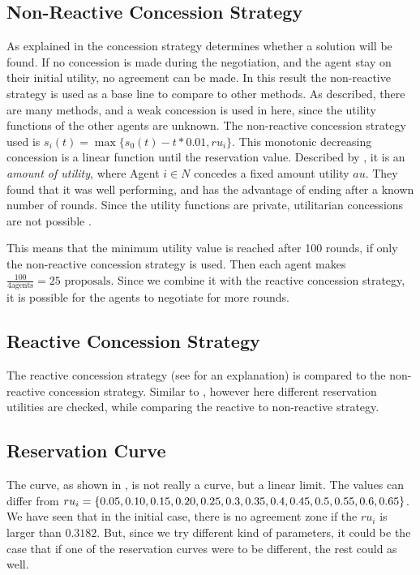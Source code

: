 \subsection{Non-Reactive Concession Strategy}
As explained in  the concession strategy determines whether a solution will be found. If no concession is made during the negotiation, and the agent stay on their initial utility, no agreement can be made. In this result the non-reactive strategy is used as a base line to compare to other methods. As described, there are many methods, and a weak concession is used in here, since the utility functions of the other agents are unknown. The non-reactive concession strategy used is $s_i(t) = \max \{s_0(t) - t * 0.01, ru_i\}$. This monotonic decreasing concession is a linear function until the reservation value. Described by \cite{wu2009efficient}, it is an \textit{amount of utility}, where Agent $ i \in N$ concedes a fixed amount utility $au$. They found that it was well performing, and has the advantage of ending after a known number of rounds. Since the utility functions are private, utilitarian concessions are not possible \citep{endriss2006monotonic}. 

This means that the minimum utility value is reached after 100 rounds, if only the non-reactive concession strategy is used. Then each agent makes $\frac{100}{4 \text{agents}} = 25 \text{ proposals}$. Since we combine it with the reactive concession strategy, it is possible for the agents to negotiate for more rounds.

\subsection{Reactive Concession Strategy}
The reactive concession strategy (see  for an explanation) is compared to the non-reactive concession strategy. Similar to \citet{zheng2015automated}, however here different reservation utilities are checked, while comparing the reactive to non-reactive strategy.

\subsection{Reservation Curve}
The curve, as shown in , is not really a curve, but a linear limit. The values can differ from 	
$ru_i = \{0.05, 0.10, 0.15, 0.20, 0.25, 0.3, 0.35, 0.4, 0.45, 0.5, \\0.55, 0.6, 0.65\}$. We have seen that in the initial case, there is no agreement zone if the $ru_i$ is larger than $0.3182$. But, since we try different kind of parameters, it could be the case that if one of the reservation curves were to be different, the rest could as well. 


